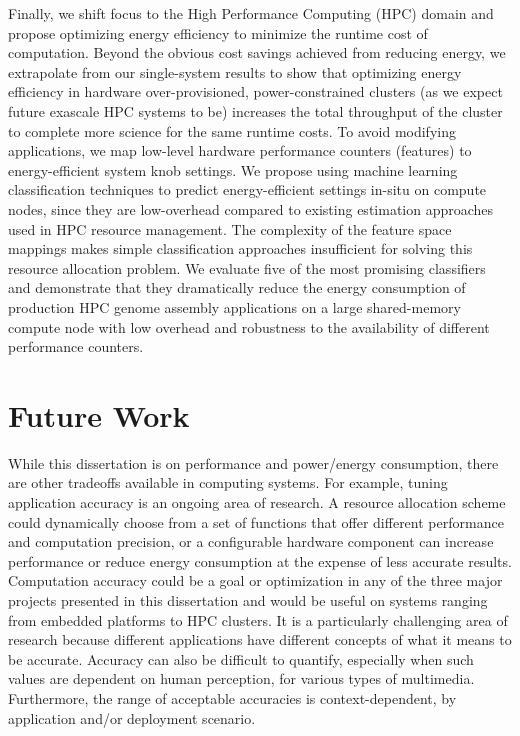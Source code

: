 Finally, we shift focus to the High Performance Computing (HPC) domain and propose optimizing energy efficiency to minimize the runtime cost of computation.
Beyond the obvious cost savings achieved from reducing energy, we extrapolate from our single-system results to show that optimizing energy efficiency in hardware over-provisioned, power-constrained clusters (as we expect future exascale HPC systems to be) increases the total throughput of the cluster to complete more science for the same runtime costs.
To avoid modifying applications, we map low-level hardware performance counters (features) to energy-efficient system knob settings.
We propose using machine learning classification techniques to predict energy-efficient settings in-situ on compute nodes, since they are low-overhead compared to existing estimation approaches used in HPC resource management.
The complexity of the feature space mappings makes simple classification approaches insufficient for solving this resource allocation problem.
We evaluate five of the most promising classifiers and demonstrate that they dramatically reduce the energy consumption of production HPC genome assembly applications on a large shared-memory compute node with low overhead and robustness to the availability of different performance counters.


\section{Future Work}

While this dissertation is on performance and power/energy consumption, there are other tradeoffs available in computing systems.
For example, tuning application accuracy is an ongoing area of research.
A resource allocation scheme could dynamically choose from a set of functions that offer different performance and computation precision, or a configurable hardware component can increase performance or reduce energy consumption at the expense of less accurate results.
Computation accuracy could be a goal or optimization in any of the three major projects presented in this dissertation and would be useful on systems ranging from embedded platforms to HPC clusters.
It is a particularly challenging area of research because different applications have different concepts of what it means to be accurate.
Accuracy can also be difficult to quantify, especially when such values are dependent on human perception, \eg for various types of multimedia.
Furthermore, the range of acceptable accuracies is context-dependent, \eg by application and/or deployment scenario.

